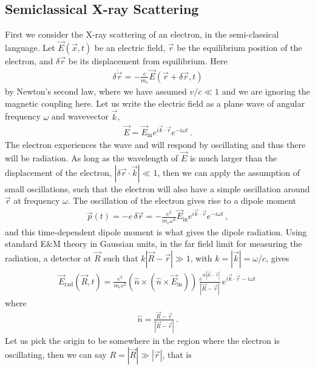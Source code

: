 \documentclass[11pt, oneside]{book}
\theoremstyle{break}
\theoremstyle{break}
\begin{document}
\subsection{Semiclassical X-ray Scattering}
First we consider the X-ray scattering of an electron, in the semi-classical language. Let $\vec{E}(\vec{x},t)$ be an electric field, $\vec{r}$ be the equilibrium position of the electron, and $\delta \vec{r}$ be its displacement from equilibrium. Here 
\begin{align*}
\delta\ddot{\vec{r}} = -\frac{e}{m_e} \vec{E}(\vec{r} + \delta \vec{r} , t)
\end{align*}
by Newton's second law, where we have assumed $v/c\ll 1$ and we are ignoring the magnetic coupling here. Let us write the electric field as a plane wave of angular frequency $\omega$ and wavevector $\vec{k}$,
\begin{align*}
\vec{E} = \vec{E}_{\text{in}}e^{i\vec{k}\cdot \vec{r}}e^{-i\omega t}\,.
\end{align*}
The electron experiences the wave and will respond by oscillating and thus there will be radiation. As long as the wavelength of $\vec{E}$ is much larger than the displacement of the electron, $|\delta \vec{r}\cdot \vec{k}|\ll 1$, then we can apply the assumption of small oscillations, such that the electron will also have a simple oscillation around $\vec{r}$ at frequency $\omega$. The oscillation of the electron gives rise to a dipole moment 
\begin{align*}
\vec{p}(t) = -e\,\delta \vec{r} = -\frac{e^2}{m_e \omega^2} \vec{E}_{\text{in}}e^{i\vec{k}\cdot \vec{r}}e^{-i\omega t}\,,
\end{align*}
and this time-dependent dipole moment is what gives the dipole radiation. Using standard E$\&$M theory in Gaussian units, in the far field limit for measuring the radiation, a detector at $\vec{R}$ such that $k|\vec{R}-\vec{r}| \gg 1$, with $k=|\vec{k}|=\omega/c$, gives
\begin{align*}
\vec{E}_{\text{rad}}(\vec{R},t) = \frac{e^2}{m_e c^2} \left( \hat{n}\times (\hat{n}\times \vec{E}_{\text{in}})\right)\,\frac{e^{ik|\vec{R}-\vec{r}|}}{|\vec{R} - \vec{r}|}\, e^{i\vec{k}\cdot \vec{r}-i\omega t} \,
\end{align*}
where 
\begin{align*}
\hat{n} = \frac{\vec{R}-\vec{r}}{|\vec{R}-\vec{r}|}\,.
\end{align*}
Let us pick the origin to be somewhere in the region where the electron is oscillating, then we can say $R=|\vec{R}| \gg |\vec{r}|$, that is 
\end{document}
